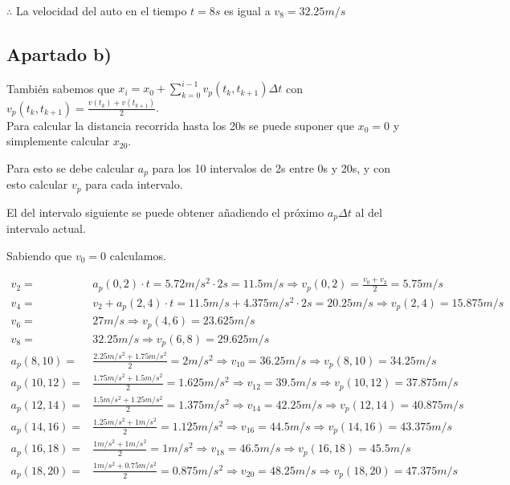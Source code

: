 \documentclass[11pt]{article}
\begin{document}
$\therefore$ La velocidad del auto en el tiempo $t = 8s$ es igual a $v_8 = 32.25m/s$

\subsection*{Apartado b)}
También sabemos que $x_i = x_0 + \displaystyle\sum_{k = 0}^{i - 1} v_p(t_k, t_{k + 1}) \Delta t$ con
$v_p(t_k, t_{k + 1}) = \frac{v(t_k) + v(t_{k+1})}{2}$. \\
Para calcular la distancia recorrida hasta los 20s se puede suponer que $x_0 = 0$
y simplemente calcular $x_{20}$.

Para esto se debe calcular $a_p$ para los 10 intervalos de 2s entre 0s y 20s, 
y con esto calcular $v_p$ para cada intervalo. 

El del intervalo siguiente se puede obtener añadiendo el próximo
$a_p\Delta t$ al del intervalo actual.

Sabiendo que $v_0 = 0$ calculamos.

\begin{align*}
  v_2 =& a_p(0, 2) \cdot t = 5.72m/s^2 \cdot 2s = 11.5 m/s
   \Rightarrow v_p(0, 2) = \frac{v_0 + v_2}{2} = 5.75m/s \\
  v_4 =& v_2 + a_p(2, 4) \cdot t = 11.5m/s + 4.375m/s^2 \cdot 2s = 20.25m/s
   \Rightarrow v_p(2, 4) = 15.875m/s \\
  v_6 =& 27m/s \Rightarrow v_p(4, 6) = 23.625m/s \\
  v_8 =& 32.25m/s \Rightarrow v_p(6, 8) = 29.625m/s \\
  a_p(8, 10) =& \frac{2.25m/s^2 + 1.75m/s^2}{2} = 2m/s^2
   \Rightarrow v_{10} = 36.25m/s \Rightarrow v_p(8, 10) = 34.25m/s \\
  a_p(10, 12) =& \frac{1.75m/s^2 + 1.5m/s^2}{2} = 1.625m/s^2
   \Rightarrow v_{12} = 39.5m/s \Rightarrow v_p(10, 12) = 37.875m/s \\
  a_p(12, 14) =& \frac{1.5m/s^2 + 1.25m/s^2}{2} = 1.375m/s^2
   \Rightarrow v_{14} = 42.25m/s \Rightarrow v_p(12, 14) = 40.875m/s \\
  a_p(14, 16) =& \frac{1.25m/s^2 + 1m/s^2}{2} = 1.125m/s^2
   \Rightarrow v_{16} = 44.5m/s \Rightarrow v_p(14, 16) = 43.375m/s \\
  a_p(16, 18) =& \frac{1m/s^2 + 1m/s^2}{2} = 1m/s^2
   \Rightarrow v_{18} = 46.5m/s \Rightarrow v_p(16, 18) = 45.5m/s \\
  a_p(18, 20) =& \frac{1m/s^2 + 0.75m/s^2}{2} = 0.875m/s^2
   \Rightarrow v_{20} = 48.25m/s \Rightarrow v_p(18, 20) = 47.375m/s \\
\end{align*}
\end{document}
